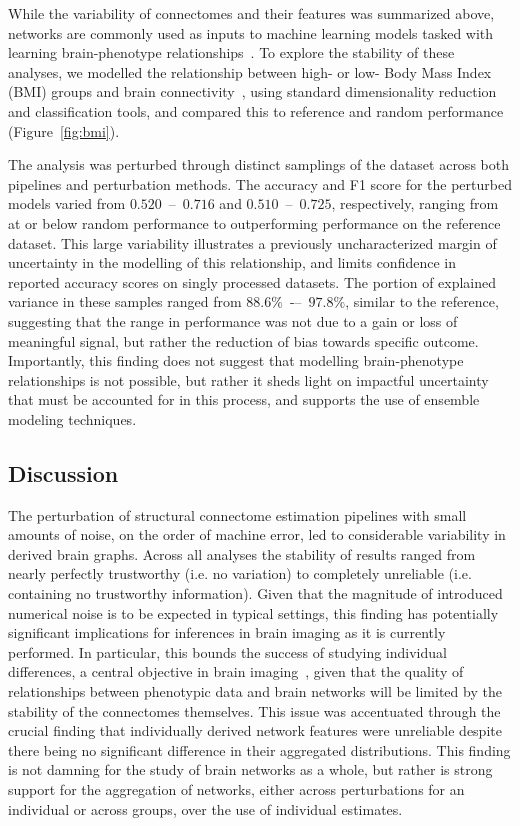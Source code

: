 \documentclass[fleqn,10pt]{SelfArx} %
\begin{document}
While the variability of connectomes and their features was summarized above, networks are commonly used as inputs to
machine learning models tasked with learning brain-phenotype relationships~\cite{Dubois2016-yr}. To explore the
stability of these analyses, we modelled the relationship between high- or low- Body Mass Index (BMI) groups and brain
connectivity~\cite{Park2015-uj,Gupta2015-ap}, using standard dimensionality reduction and classification tools, and
compared this to reference and random performance (Figure~\ref{fig:bmi}).

The analysis was perturbed through distinct samplings of the dataset across both pipelines and perturbation methods.
The accuracy and F1 score for the perturbed models varied from $0.520$~–~$0.716$ and $0.510$~–~$0.725$, respectively,
ranging from at or below random performance to outperforming performance on the reference dataset. This large
variability illustrates a previously uncharacterized margin of uncertainty in the modelling of this relationship, and
limits confidence in reported accuracy scores on singly processed datasets. The portion of explained variance in these
samples ranged from $88.6\%$~-–~$97.8\%$, similar to the reference, suggesting that the range in performance was not
due to a gain or loss of meaningful signal, but rather the reduction of bias towards specific outcome. Importantly,
this finding does not suggest that modelling brain-phenotype relationships is not possible, but rather it sheds light
on impactful uncertainty that must be accounted for in this process, and supports the use of ensemble modeling
techniques.

\subsection*{Discussion}

The perturbation of structural connectome estimation pipelines with small amounts of noise, on the order of machine
error, led to considerable variability in derived brain graphs. Across all analyses the stability of results ranged
from nearly perfectly trustworthy (i.e. no variation) to completely unreliable (i.e. containing no trustworthy
information). Given that the magnitude of introduced numerical noise is to be expected in typical settings, this
finding has potentially significant implications for inferences in brain imaging as it is currently performed. In
particular, this bounds the success of studying individual differences, a central objective in brain
imaging~\cite{Dubois2016-yr}, given that the quality of relationships between phenotypic data and brain networks will
be limited by the stability of the connectomes themselves. This issue was accentuated through the crucial finding that
individually derived network features were unreliable despite there being no significant difference in their aggregated
distributions. This finding is not damning for the study of brain networks as a whole, but rather is strong support for
the aggregation of networks, either across perturbations for an individual or across groups, over the use of individual
estimates.
\end{document}
